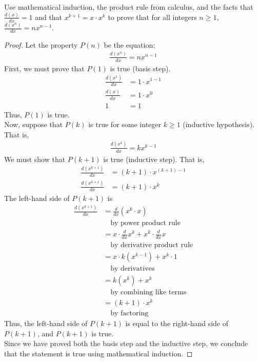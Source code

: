 \documentclass[name=Ojas\ Chaturvedi, emailid=oj.chaturvedi.2024, course=Capstone:\ Discrete\ Math, num=8, deadline={November\ 2,\ 2023}]{homework}
\begin{document}
Use mathematical induction, the product rule from calculus, and the facts that $\frac{d(x)}{dx} = 1$ and that $x^{k+1} = x \cdot x^k$ to prove that for all integers $n \geq 1$, $\frac{d(x^n)}{dx} = nx^{n-1}$.
\begin{proof}
    Let the property $P(n)$ be the equation:
    \begin{align*}
        \frac{d(x^n)}{dx} = nx^{n-1}
    \end{align*}
    First, we must prove that $P(1)$ is true (basis step). \\
    \begin{align*}
        \frac{d(x^1)}{dx} &= 1 \cdot x^{1-1} \\
        \frac{d(x)}{dx} &= 1 \cdot x^{0} \\
        1 &= 1
    \end{align*}
    Thus, $P(1)$ is true. \\
    Now, suppose that $P(k)$ is true for some integer $k \geq 1$ (inductive hypothesis). That is,
    \begin{align*}
        \frac{d(x^k)}{dx} = kx^{k-1}
    \end{align*}
    We must show that $P(k+1)$ is true (inductive step). That is,
    \begin{align*}
        \frac{d(x^{k+1})}{dx} &= (k+1) \cdot x^{(k+1)-1} \\
        \frac{d(x^{k+1})}{dx} &= (k+1) \cdot x^{k}
    \end{align*}
    The left-hand side of $P(k+1)$ is
    \begin{align*}
        \frac{d(x^{k+1})}{dx} &=\frac{d}{dx}(x^k \cdot x) \\
        & \quad \text{by power product rule} \\
        &= x \cdot \frac{d}{dx}x^k + x^k \cdot \frac{d}{dx}x \\
        & \quad \text{by derivative product rule} \\
        &= x \cdot k(x^{k-1}) + x^k \cdot 1\\
        & \quad \text{by derivatives} \\
        &= k(x^k) + x^k \\
        & \quad \text{by combining like terms} \\
        &= (k+1) \cdot x^k \\
        & \quad \text{by factoring}
    \end{align*}
    Thus, the left-hand side of $P(k+1)$ is equal to the right-hand side of $P(k+1)$, and $P(k+1)$ is true. \\
    Since we have proved both the basis step and the inductive step, we conclude that the statement is true using mathematical induction.
\end{proof}
\end{document}
